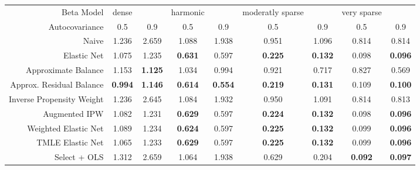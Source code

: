\begin{table}[ht]
\centering
\begin{tabular}{|r|cc|cc|cc|cc|}
   \hline
Beta Model & dense &  & harmonic &  & moderatly sparse &  & very sparse &  \\ 
  Autocovariance & 0.5 & 0.9 & 0.5 & 0.9 & 0.5 & 0.9 & 0.5 & 0.9 \\ 
   \hline
Naive & 1.236 & 2.659 & 1.088 & 1.938 & 0.951 & 1.096 & 0.814 & 0.814 \\ 
  Elastic Net & 1.075 & 1.235 &  \bf 0.631 & 0.597 &  \bf 0.225 &  \bf 0.132 & 0.098 &  \bf 0.096 \\ 
   \hline
Approximate Balance & 1.153 &  \bf 1.125 & 1.034 & 0.994 & 0.921 & 0.717 & 0.827 & 0.569 \\ 
  Approx. Residual Balance &  \bf 0.994 &  \bf 1.146 &  \bf 0.614 &  \bf 0.554 &  \bf 0.219 &  \bf 0.131 & 0.109 &  \bf 0.100 \\ 
   \hline
Inverse Propensity Weight & 1.236 & 2.645 & 1.084 & 1.932 & 0.950 & 1.091 & 0.814 & 0.813 \\ 
  Augmented IPW & 1.082 & 1.231 &  \bf 0.629 & 0.597 &  \bf 0.224 &  \bf 0.132 & 0.098 &  \bf 0.096 \\ 
   \hline
Weighted Elastic Net & 1.089 & 1.234 &  \bf 0.624 & 0.597 &  \bf 0.225 &  \bf 0.132 & 0.099 &  \bf 0.096 \\ 
  TMLE Elastic Net & 1.065 & 1.233 &  \bf 0.629 & 0.597 &  \bf 0.225 &  \bf 0.132 & 0.099 &  \bf 0.096 \\ 
   \hline
Select + OLS & 1.312 & 2.659 & 1.064 & 1.938 & 0.629 & 0.204 &  \bf 0.092 &  \bf 0.097 \\ 
   \hline
\end{tabular}
\end{table}
